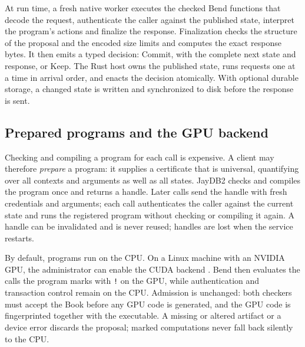 \documentclass[12pt]{article}
\newcommand{\code}[1]{\texttt{#1}}
\begin{document}
At run time, a fresh native worker executes the checked Bend functions that
decode the request, authenticate the caller against the published state,
interpret the program's actions and finalize the response.
Finalization checks the structure of the proposal and the encoded size limits
and computes the exact response bytes. It then emits a typed decision: Commit,
with the complete next state and response, or Keep. The Rust host owns the
published state, runs requests one at a time in arrival order, and enacts the
decision atomically. With optional durable storage, a changed state is written
and synchronized to disk before the response is sent.

\subsection{Prepared programs and the GPU backend}
Checking and compiling a program for each call is expensive. A client may
therefore \emph{prepare} a program: it supplies a certificate that is universal,
quantifying over all contexts and arguments as well as all states. JayDB2
checks and compiles the program once and returns a handle. Later calls send the
handle with fresh credentials and arguments; each call authenticates the caller
against the current state and runs the registered program without checking or
compiling it again. A handle can be invalidated and is never reused; handles are
lost when the service restarts.

By default, programs run on the CPU. On a Linux machine with an NVIDIA GPU, the
administrator can enable the CUDA backend \cite{cuda}. Bend then evaluates the
calls the program marks with \code{!} on the GPU, while authentication and
transaction control remain on the CPU. Admission is unchanged: both checkers
must accept the Book before any GPU code is generated, and the GPU code is
fingerprinted together with the executable. A missing or altered artifact or a
device error discards the proposal; marked computations never fall back silently
to the CPU.
\end{document}
